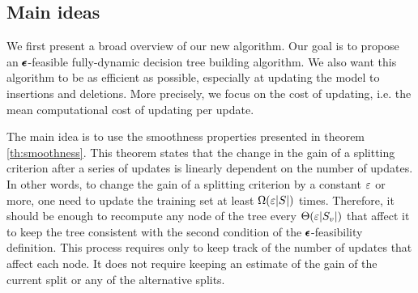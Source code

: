 

\subsection{Main ideas}\label{subsec:fudy_main_ideas}
We first present a broad overview of our new algorithm. Our goal is to propose an $\pmb{\epsilon}$-feasible fully-dynamic decision tree building algorithm. We also want this algorithm to be as efficient as possible, especially at updating the model to insertions and deletions. More precisely, we focus on the  cost of updating, i.e. the mean computational cost of updating per update.

The main idea is to use the smoothness properties presented in theorem \ref{th:smoothness}. This theorem states that the change in the gain of a splitting criterion after a series of updates is linearly dependent on the number of updates. In other words, to change the gain of a splitting criterion by a constant $\varepsilon$ or more, one need to update the training set at least $\Omega(\varepsilon |S|)$ times. Therefore, it should be enough to recompute any node of the tree every $\Theta(\varepsilon |S_v|)$ that affect it to keep the tree consistent with the second condition of the $\pmb{\epsilon}$-feasibility definition. This process requires only to keep track of the number of updates that affect each node. It does not require keeping an estimate of the gain of the current split or any of the alternative splits.

